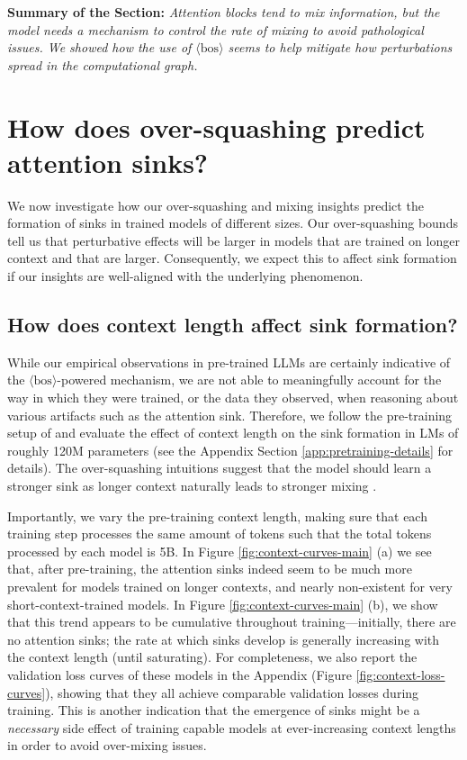 \documentclass{article} %
\newcommand{\bos}{\ensuremath{\langle\text{bos}\rangle}\xspace}
\begin{document}
\begin{tcolorbox}[boxsep=0mm,left=2.5mm,right=2.5mm] \textbf{Summary of the Section:} {\em Attention blocks tend to mix information, but the model needs a mechanism to control the rate of mixing to avoid pathological issues. We showed how the use of \bos seems to help mitigate how perturbations spread in the computational graph.}  
\end{tcolorbox}

\section{How does over-squashing predict attention sinks?}
\label{sec:frontier-llms}

We now investigate how our over-squashing and mixing insights predict the formation of sinks in trained models of different sizes. Our over-squashing bounds tell us that perturbative effects will be larger in models that are trained on longer context and that are larger. Consequently, we expect this to affect sink formation if our insights are well-aligned with the underlying phenomenon.

\subsection{How does context length affect sink formation?}

While our empirical observations in pre-trained LLMs are certainly indicative of the \bos-powered mechanism, we are not able to meaningfully account for the way in which they were trained, or the data they observed, when reasoning about various artifacts such as the attention sink. Therefore, we follow the pre-training setup of \cite{gu2025when} and evaluate the effect of context length on the sink formation in LMs of roughly 120M parameters (see the Appendix Section \ref{app:pretraining-details} for details). The over-squashing intuitions suggest that the model should learn a stronger sink as longer context naturally leads to stronger mixing \citep{velivckovic2024softmax}.  


Importantly, we vary the pre-training context length, making sure that each training step processes the same amount of tokens such that the total tokens processed by each model is 5B. In Figure \ref{fig:context-curves-main} (a) we see that, after pre-training, the attention sinks indeed seem to be much more prevalent for models trained on longer contexts, and nearly non-existent for very short-context-trained models. In Figure \ref{fig:context-curves-main} (b), we show that this trend appears to be cumulative throughout training---initially, there are no attention sinks; the rate at which sinks develop is generally increasing with the context length (until saturating). For completeness, we also report the validation loss curves of these models in the Appendix (Figure \ref{fig:context-loss-curves}), showing that they all achieve comparable validation losses during training. This is another indication that the emergence of sinks might be a \emph{necessary} side effect of training capable models at ever-increasing context lengths in order to avoid over-mixing issues.
\end{document}
